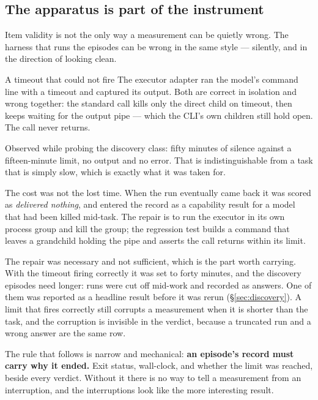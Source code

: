 \subsection{The apparatus is part of the instrument}\label{sec:apparatus}

Item validity is not the only way a measurement can be quietly wrong. The harness that runs the episodes can be wrong in the same style --- silently, and in the direction of looking clean.

\begin{cautionbox}{A timeout that could not fire}
The executor adapter ran the model's command line with a timeout and captured its output. Both are correct in isolation and wrong together: the standard call kills only the direct child on timeout, then keeps waiting for the output pipe --- which the CLI's own children still hold open. The call never returns.

Observed while probing the discovery class: fifty minutes of silence against a fifteen-minute limit, no output and no error. That is indistinguishable from a task that is simply slow, which is exactly what it was taken for.

The cost was not the lost time. When the run eventually came back it was scored as \emph{delivered nothing}, and entered the record as a capability result for a model that had been killed mid-task. The repair is to run the executor in its own process group and kill the group; the regression test builds a command that leaves a grandchild holding the pipe and asserts the call returns within its limit.
\end{cautionbox}

The repair was necessary and not sufficient, which is the part worth carrying. With the timeout firing correctly it was set to forty minutes, and the discovery episodes need longer: runs were cut off mid-work and recorded as answers. One of them was reported as a headline result before it was rerun (\S\ref{sec:discovery}). A limit that fires correctly still corrupts a measurement when it is shorter than the task, and the corruption is invisible in the verdict, because a truncated run and a wrong answer are the same row.

The rule that follows is narrow and mechanical: \textbf{an episode's record must carry why it ended.} Exit status, wall-clock, and whether the limit was reached, beside every verdict. Without it there is no way to tell a measurement from an interruption, and the interruptions look like the more interesting result.

